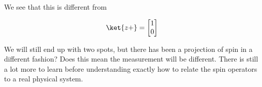 We see that this is different from

\begin{equation}\label{eqn:PHY356Foct19:2012}
\ket{z+} =
\begin{bmatrix}
1 \\
0
\end{bmatrix}
\end{equation}

We will still end up with two spots, but there has been a projection of spin in a different fashion?  Does this mean the measurement will be different.  There is still a lot more to learn before understanding exactly how to relate the spin operators to a real physical system.

